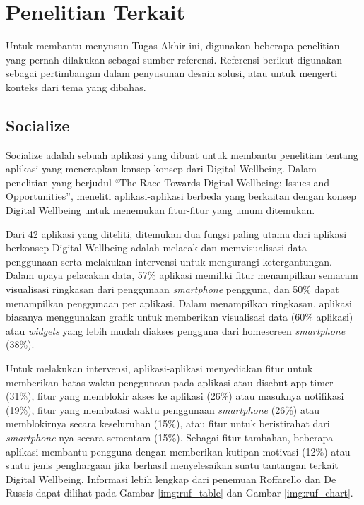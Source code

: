 \justifying
\FloatBarrier


\section{Penelitian Terkait}

Untuk membantu menyusun Tugas Akhir ini, digunakan beberapa penelitian yang pernah dilakukan sebagai sumber referensi. Referensi berikut digunakan sebagai pertimbangan dalam penyusunan desain solusi, atau untuk mengerti konteks dari tema yang dibahas.

\subsection{Socialize}

Socialize adalah sebuah aplikasi yang dibuat untuk membantu penelitian tentang aplikasi yang menerapkan konsep-konsep dari Digital Wellbeing. Dalam penelitian yang berjudul “The Race Towards Digital Wellbeing: Issues and Opportunities”, \textcite{CHI2019SOCIALIZE} meneliti aplikasi-aplikasi berbeda yang berkaitan dengan konsep Digital Wellbeing untuk menemukan fitur-fitur yang umum ditemukan.

Dari 42 aplikasi yang diteliti, ditemukan dua fungsi paling utama dari aplikasi berkonsep Digital Wellbeing adalah melacak dan memvisualisasi data penggunaan serta melakukan intervensi untuk mengurangi ketergantungan. Dalam upaya pelacakan data, 57\% aplikasi memiliki fitur menampilkan semacam visualisasi ringkasan dari penggunaan \textit{smartphone} pengguna, dan 50\% dapat menampilkan penggunaan per aplikasi. Dalam menampilkan ringkasan, aplikasi biasanya menggunakan grafik untuk memberikan visualisasi data (60\% aplikasi) atau \textit{widgets} yang lebih mudah diakses pengguna dari homescreen \textit{smartphone} (38\%).

Untuk melakukan intervensi, aplikasi-aplikasi menyediakan fitur untuk memberikan batas waktu penggunaan pada aplikasi atau disebut app timer (31\%), fitur yang memblokir akses ke aplikasi (26\%) atau masuknya notifikasi (19\%), fitur yang membatasi waktu penggunaan \textit{smartphone} (26\%) atau memblokirnya secara keseluruhan (15\%), atau fitur untuk beristirahat dari \textit{smartphone}-nya secara sementara (15\%). Sebagai fitur tambahan, beberapa aplikasi membantu pengguna dengan memberikan kutipan motivasi (12\%) atau suatu jenis penghargaan jika berhasil menyelesaikan suatu tantangan terkait Digital Wellbeing. Informasi lebih lengkap dari penemuan Roffarello dan De Russis dapat dilihat pada Gambar \ref{img:ruf_table} dan Gambar \ref{img:ruf_chart}.

